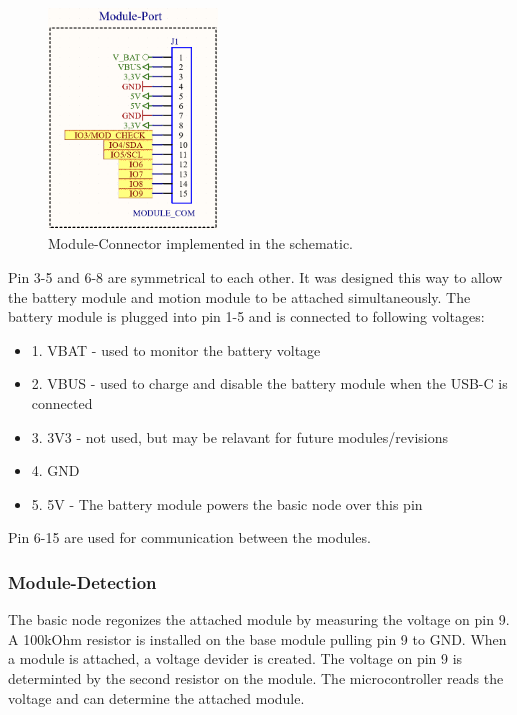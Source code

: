     \begin{figure}[H]
        \centering
        \includegraphics[width=0.4\textwidth]{assets/HW/Module-Connector-schematic.png}
        \caption{Module-Connector implemented in the schematic.}
    \end{figure}

    Pin 3-5 and 6-8 are symmetrical to each other. It was designed this way
    to allow the battery module and motion module to be attached simultaneously.
    The battery module is plugged into pin 1-5 and is connected to following 
    voltages:
    
    \begin{itemize}
        \item 1. VBAT - used to monitor the battery voltage
        \item 2. VBUS - used to charge and disable the battery module when the USB-C 
        is connected
        \item 3. 3V3 - not used, but may be relavant for future modules/revisions
        \item 4. GND
        \item 5. 5V - The battery module powers the basic node over this pin
    \end{itemize}

    Pin 6-15 are used for communication between the modules. 


    \subsubsection{Module-Detection}
    
    The basic node regonizes the attached module by measuring the voltage on pin 9.
    A 100kOhm resistor is installed on the base module pulling pin 9 to GND. 
    When a module is attached, a voltage devider is created. The voltage on pin 9 is 
    determinted by the second resistor on the module. The microcontroller reads the
    voltage and can determine the attached module. 
    
